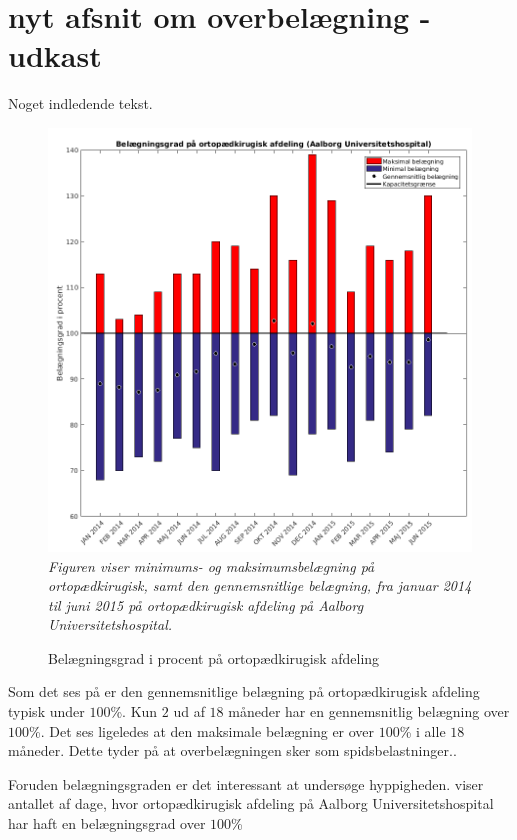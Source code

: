 \section{nyt afsnit om overbelægning - udkast}

Noget indledende tekst. 

\begin{figure}[H]
	\flushleft 
	\caption{Belægningsgrad i procent på ortopædkirugisk afdeling}
	\centering
	\includegraphics[scale=.5]{figures/maxminoverbelaeg.png}
	\label{maxminbelaeg}
	\flushleft
	\textit{Figuren viser minimums- og maksimumsbelægning på ortopædkirugisk, samt den gennemsnitlige belægning, fra januar 2014 til juni 2015 på ortopædkirugisk afdeling på Aalborg Universitetshospital.}
\end{figure}

Som det ses på  er den gennemsnitlige belægning på ortopædkirugisk afdeling typisk under $100$\%. Kun $2$ ud af $18$ måneder har en gennemsnitlig belægning over $100$\%. Det ses ligeledes at den maksimale belægning er over $100$\% i alle $18$ måneder. Dette tyder på at overbelægningen sker som spidsbelastninger..

Foruden belægningsgraden er det interessant at undersøge hyppigheden.  viser antallet af dage, hvor ortopædkirugisk afdeling på Aalborg Universitetshospital har haft en belægningsgrad over $100$\%

